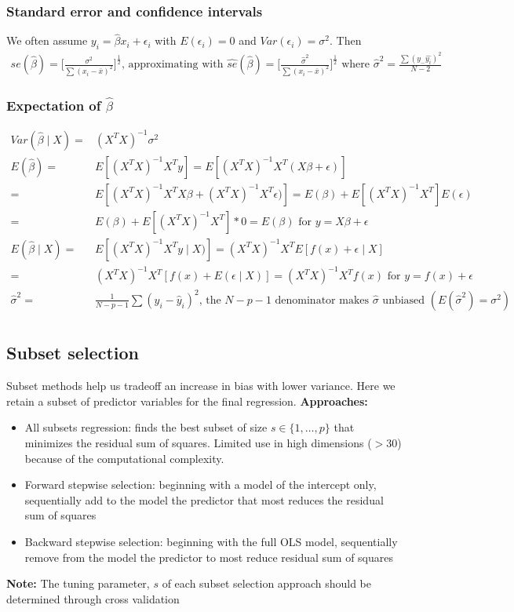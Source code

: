 \documentclass{article}
\begin{document}
\subsubsection{Standard error and confidence intervals}
We often assume $y_i = \hat{\beta}x_i + \epsilon_i$ with $E(\epsilon_i) = 0$ and $Var(\epsilon_i) = \sigma^2$. Then
\begin{align*}
  se(\hat{\beta}) = \biggl[ \frac{\sigma^2}{\sum(x_i - \bar{x})^2}\biggr]^{\frac{1}{2}} \textrm{, approximating with } \hat{se}(\hat{\beta}) = \biggl[ \frac{\hat{\sigma}^2}{\sum(x_i - \bar{x})^2}\biggr]^{\frac{1}{2}} \textrm{ where } \hat{\sigma}^2 = \frac{\sum(y_ - \hat{y_i})^2}{N-2}
\end{align*}

\subsubsection{Expectation of $\hat{\beta}$}
\begin{align*}
  Var(\hat{\beta} \mid X) =& (X^TX)^{-1}\sigma^2\\
  E(\hat{\beta}) =& E[(X^TX)^{-1}X^Ty] = E[(X^TX)^{-1}X^T(X\beta + \epsilon)]\\
  =& E[(X^TX)^{-1}X^TX\beta + (X^TX)^{-1}X^T\epsilon)] = E(\beta) + E[(X^TX)^{-1}X^T]E(\epsilon)\\
  =& E(\beta) + E[(X^TX)^{-1}X^T]*0 = E(\beta) \textrm{ for } y = X\beta + \epsilon\\
  E(\hat{\beta}\mid X) =& E[(X^TX)^{-1}X^Ty \mid X)] = (X^TX)^{-1}X^TE[f(x) + \epsilon \mid X]\\
  =& (X^TX)^{-1}X^T[f(x) + E(\epsilon \mid X)] = (X^TX)^{-1}X^Tf(x) \textrm{ for } y=f(x) + \epsilon\\
  \hat{\sigma}^2 =& \frac{1}{N - p - 1}\sum(y_i - \hat{y}_i)^2 \textrm{, the $N-p-1$ denominator makes $\hat{\sigma}$ unbiased } (E(\hat{\sigma}^2) = \sigma^2)\\
\end{align*}

\subsection{Subset selection}
Subset methods help us tradeoff an increase in bias with lower variance. Here we retain a subset of predictor variables for the final regression.
\textbf{Approaches:}
\begin{itemize}
  \item All subsets regression: finds the best subset of size $s \in \{1, \dots, p\}$ that minimizes the residual sum of squares. Limited use in high dimensions ($>30$) because of the computational complexity. 
  \item Forward stepwise selection: beginning with a model of the intercept only, sequentially add to the model the predictor that most reduces the residual sum of squares
  \item Backward stepwise selection: beginning with the full OLS model, sequentially remove from the model the predictor to most reduce residual sum of squares
\end{itemize}
\textbf{Note:} The tuning parameter, $s$ of each subset selection approach should be determined through cross validation
\end{document}

